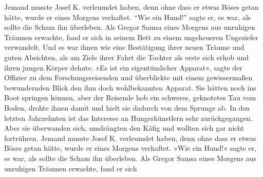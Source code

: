 \documentclass[german, 12pt]{g-brief}
\newcommand{\LyxGruss}[1]{\Gruss{#1}{0.5cm}}
\begin{document}









\Datum{\today}


\LyxGruss{Mit freundlichen Grüßen}

\begin{g-brief}
Jemand musste Josef K. verleumdet haben, denn ohne dass er etwas Böses getan hätte,
wurde er eines Morgens verhaftet. "`Wie ein Hund!"' sagte er, es war, als sollte die Scham ihn überleben.
 Als Gregor Samsa eines Morgens aus unruhigen Träumen erwachte,
 fand er sich in seinem Bett zu einem ungeheueren Ungeziefer verwandelt.
 Und es war ihnen wie eine Bestätigung ihrer neuen Träume und guten Absichten,
 als am Ziele ihrer Fahrt die Tochter als erste sich erhob und ihren jungen Körper dehnte.
 »Es ist ein eigentümlicher Apparat«, sagte der Offizier zu dem Forschungsreisenden
 und überblickte mit einem gewissermaßen bewundernden Blick den ihm doch wohlbekannten Apparat.
 Sie hätten noch ins Boot springen können, aber der Reisende hob ein schweres, geknotetes Tau vom Boden,
 drohte ihnen damit und hielt sie dadurch von dem Sprunge ab.
 In den letzten Jahrzehnten ist das Interesse an Hungerkünstlern sehr zurückgegangen.
 Aber sie überwanden sich, umdrängten den Käfig und wollten sich gar nicht fortrühren.
 Jemand musste Josef K. verleumdet haben, denn ohne dass er etwas Böses getan hätte,
 wurde er eines Morgens verhaftet. »Wie ein Hund!« sagte er, es war, als sollte die Scham ihn überleben.
 Als Gregor Samsa eines Morgens aus unruhigen Träumen erwachte, fand er sich

\end{g-brief}
\end{document}
